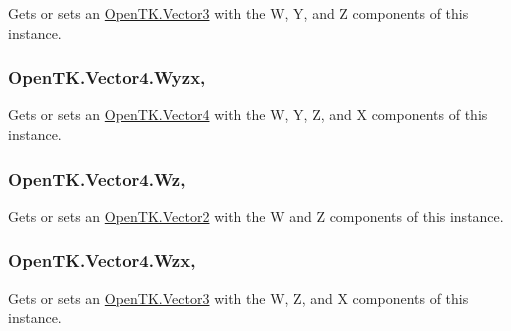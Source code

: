 Gets or sets an \hyperlink{struct_open_t_k_1_1_vector3}{Open\-T\-K.\-Vector3} with the W, Y, and Z components of this instance. 

\hypertarget{struct_open_t_k_1_1_vector4_a0b6a28602302d64606e828a4b20b256b}{
\subsubsection[{Wyzx}]{ Open\-T\-K.\-Vector4.\-Wyzx\hspace{0.3cm}{\ttfamily [get]}, {\ttfamily [set]}}}\label{struct_open_t_k_1_1_vector4_a0b6a28602302d64606e828a4b20b256b}


Gets or sets an \hyperlink{struct_open_t_k_1_1_vector4}{Open\-T\-K.\-Vector4} with the W, Y, Z, and X components of this instance. 

\hypertarget{struct_open_t_k_1_1_vector4_ade8939578bfd094a45806c8394927770}{
\subsubsection[{Wz}]{ Open\-T\-K.\-Vector4.\-Wz\hspace{0.3cm}{\ttfamily [get]}, {\ttfamily [set]}}}\label{struct_open_t_k_1_1_vector4_ade8939578bfd094a45806c8394927770}


Gets or sets an \hyperlink{struct_open_t_k_1_1_vector2}{Open\-T\-K.\-Vector2} with the W and Z components of this instance. 

\hypertarget{struct_open_t_k_1_1_vector4_a9a8ec929cd4595fd41016473a729f0ef}{
\subsubsection[{Wzx}]{ Open\-T\-K.\-Vector4.\-Wzx\hspace{0.3cm}{\ttfamily [get]}, {\ttfamily [set]}}}\label{struct_open_t_k_1_1_vector4_a9a8ec929cd4595fd41016473a729f0ef}


Gets or sets an \hyperlink{struct_open_t_k_1_1_vector3}{Open\-T\-K.\-Vector3} with the W, Z, and X components of this instance. 

